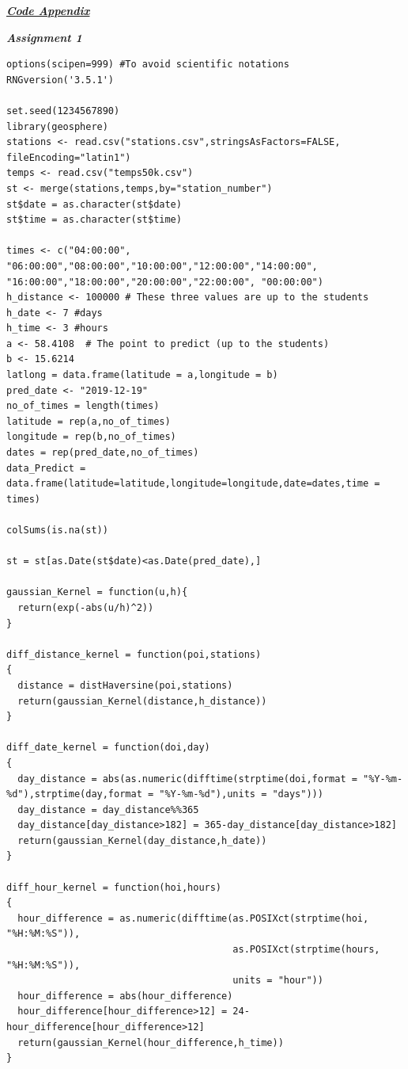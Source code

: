 \documentclass[a4paper,10pt]{article}
\begin{document}
\par
\vspace{0.5cm}
\huge \textbf{\emph{\underline{Code Appendix}}} \par
\large \textit{\textbf{Assignment 1}} \par
\begin{lstlisting}
options(scipen=999) #To avoid scientific notations
RNGversion('3.5.1')

set.seed(1234567890)
library(geosphere)
stations <- read.csv("stations.csv",stringsAsFactors=FALSE, fileEncoding="latin1")
temps <- read.csv("temps50k.csv")
st <- merge(stations,temps,by="station_number")
st$date = as.character(st$date)
st$time = as.character(st$time)

times <- c("04:00:00", "06:00:00","08:00:00","10:00:00","12:00:00","14:00:00", "16:00:00","18:00:00","20:00:00","22:00:00", "00:00:00")
h_distance <- 100000 # These three values are up to the students
h_date <- 7 #days
h_time <- 3 #hours
a <- 58.4108  # The point to predict (up to the students)
b <- 15.6214
latlong = data.frame(latitude = a,longitude = b)
pred_date <- "2019-12-19"
no_of_times = length(times)
latitude = rep(a,no_of_times)
longitude = rep(b,no_of_times)
dates = rep(pred_date,no_of_times)
data_Predict = data.frame(latitude=latitude,longitude=longitude,date=dates,time = times)

colSums(is.na(st))

st = st[as.Date(st$date)<as.Date(pred_date),]

gaussian_Kernel = function(u,h){
  return(exp(-abs(u/h)^2))
}

diff_distance_kernel = function(poi,stations)
{
  distance = distHaversine(poi,stations)
  return(gaussian_Kernel(distance,h_distance))
}

diff_date_kernel = function(doi,day)
{
  day_distance = abs(as.numeric(difftime(strptime(doi,format = "%Y-%m-%d"),strptime(day,format = "%Y-%m-%d"),units = "days")))
  day_distance = day_distance%%365
  day_distance[day_distance>182] = 365-day_distance[day_distance>182]
  return(gaussian_Kernel(day_distance,h_date))
}

diff_hour_kernel = function(hoi,hours)
{
  hour_difference = as.numeric(difftime(as.POSIXct(strptime(hoi, "%H:%M:%S")),
                                        as.POSIXct(strptime(hours, "%H:%M:%S")),
                                        units = "hour"))
  hour_difference = abs(hour_difference)
  hour_difference[hour_difference>12] = 24-hour_difference[hour_difference>12]
  return(gaussian_Kernel(hour_difference,h_time))
}


\end{lstlisting}
\end{document}
